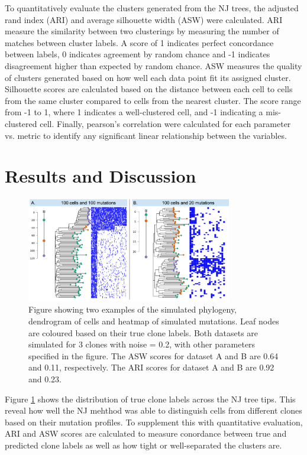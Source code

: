 \documentclass{article}
\begin{document}
To quantitatively evaluate the clusters generated from the NJ trees, the adjusted rand index (ARI) and average silhouette width (ASW) were calculated. ARI measure the similarity between two clusterings by measuring the number of matches between cluster labels. A score of 1 indicates perfect concordance between labels, 0 indicates agreement by random chance and -1 indicates disagreement higher than expected by random chance. ASW measures the quality of clusters generated based on how well each data point fit its assigned cluster. Silhouette scores are calculated based on the distance between each cell to cells from the same cluster compared to cells from the nearest cluster. The score range from -1 to 1, where 1 indicates a well-clustered cell, and -1 indicating a mis-clustered cell. Finally, pearson's correlation were calculated for each parameter vs. metric to identify any significant linear relationship between the variables.

\section{Results and Discussion}
\begin{figure}[!ht]\centering\includegraphics[width=0.8\textwidth]{fig/result.png}
\caption{\label{fig:result} Figure showing two examples of the simulated phylogeny, dendrogram of cells and heatmap of simulated mutations. Leaf nodes are coloured based on their true clone labels. Both datasets are simulated for 3 clones with noise = 0.2, with other parameters specified in the figure. The ASW scores for dataset A and B are 0.64 and 0.11, respectively. The ARI scores for dataset A and B are 0.92 and 0.23.}      
\end{figure}


Figure \ref{fig:result} shows the distribution of true clone labels across the NJ tree tips. This reveal how well the NJ mehthod was able to distinguish cells from different clones based on their mutation profiles. To supplement this with quantitative evaluation, ARI and ASW scores are calculated to measure conordance between true and predicted clone labels as well as how tight or well-separated the clusters are.
\end{document}
